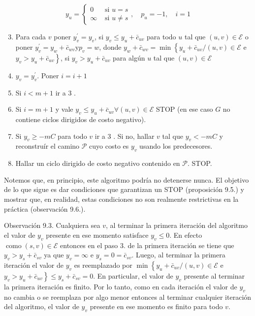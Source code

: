 \documentclass[10pt]{article}
\begin{document}
$$
y_{u}=\left\{\begin{array}{ll}
0 & \text { si } u=s \\
\infty & \text { si } u \neq s
\end{array}, \quad p_{u}=-1, \quad i=1\right.
$$

\begin{enumerate}
  \setcounter{enumi}{2}
  \item Para cada $v$ poner $y_{v}^{\prime}=y_{v}$, si $y_{v} \leq y_{u}+\bar{c}_{u v}$ para todo $u$ tal que $(u, v) \in \mathcal{E}$ o poner $y_{v}^{\prime}=y_{w}+\bar{c}_{w v} \mathrm{y} p_{v}=w$, donde $y_{w}+\bar{c}_{w v}=\min \left\{y_{u}+\bar{c}_{u v} /(u, v) \in \mathcal{E}\right.$ e $\left.y_{v}>y_{u}+\bar{c}_{u v}\right\}$, si $y_{v}>y_{u}+\bar{c}_{u v}$ para algún $u$ tal que $(u, v) \in \mathcal{E}$
  \item $y_{v}=y_{v}^{\prime}$. Poner $i=i+1$
  \item Si $i<m+1$ ir a 3 .
  \item Si $i=m+1$ y vale $y_{v} \leq y_{u}+\bar{c}_{u v} \forall(u, v) \in \mathcal{E}$ STOP (en ese caso $G$ no contiene ciclos dirigidos de costo negativo).
  \item Si $y_{v} \geq-m C$ para todo $v$ ir a 3 . Si no, hallar $v$ tal que $y_{v}<-m C$ y reconstruír el camino $\mathcal{P}$ cuyo costo es $y_{v}$ usando los predecesores.
  \item Hallar un ciclo dirigido de costo negativo contenido en $\mathcal{P}$. STOP.
\end{enumerate}

Notemos que, en principio, este algoritmo podría no detenerse nunca. El objetivo de lo que sigue es dar condiciones que garantizan un STOP (proposición 9.5.) y mostrar que, en realidad, estas condiciones no son realmente restrictivas en la práctica (observación 9.6.).

Observación 9.3. Cualquiera sea $v$, al terminar la primera iteración del algoritmo el valor de $y_{v}$ presente en ese momento satisface $y_{v} \leq 0$. En efecto $\operatorname{como}(s, v) \in \mathcal{E}$ entonces en el paso 3. de la primera iteración se tiene que $y_{v}>y_{s}+\bar{c}_{s v}$ ya que $y_{v}=\infty$ e $y_{s}=0=\bar{c}_{s v}$. Luego, al terminar la primera iteración el valor de $y_{v}$ es reemplazado por $\min \left\{y_{u}+\bar{c}_{u v} /(u, v) \in \mathcal{E}\right.$ e $\left.y_{v}>y_{u}+\bar{c}_{u v}\right\} \leq y_{s}+\bar{c}_{s v}=0$. En particular, el valor de $y_{v}$ presente al terminar la primera iteración es finito. Por lo tanto, como en cada iteración el valor de $y_{v}$ no cambia o se reemplaza por algo menor entonces al terminar cualquier iteración del algoritmo, el valor de $y_{v}$ presente en ese momento es finito para todo $v$.
\end{document}
